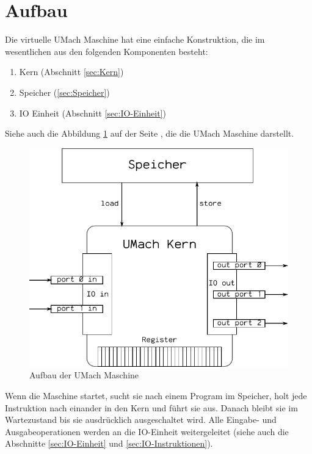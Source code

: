 \section{Aufbau}
\label{sec:Aufbau}

Die virtuelle UMach Maschine hat eine einfache Konstruktion, die im
wesentlichen aus den folgenden Komponenten besteht:
\begin{enumerate}
 \item Kern (Abschnitt \ref{sec:Kern})
 \item Speicher (\ref{sec:Speicher})
 \item IO Einheit (Abschnitt \ref{sec:IO-Einheit})
\end{enumerate}

Siehe auch die Abbildung \ref{fig:umach-aufbau} auf der Seite
\pageref{fig:umach-aufbau}, die die UMach Maschine darstellt.

\begin{figure}[htp]
 \centering
 \includegraphics{./img/UMach-Aufbau.pdf}
 \caption{Aufbau der UMach Maschine}
 \label{fig:umach-aufbau}
\end{figure}

Wenn die Maschine startet, sucht sie nach einem Program im Speicher, holt jede
Instruktion nach einander in den Kern und führt sie aus. Danach bleibt sie im
Wartezustand bis sie ausdrücklich ausgeschaltet wird. Alle Eingabe- und
Ausgabeoperationen werden an die IO-Einheit weitergeleitet (siehe auch die
Abschnitte \ref{sec:IO-Einheit} und \ref{sec:IO-Instruktionen}).




